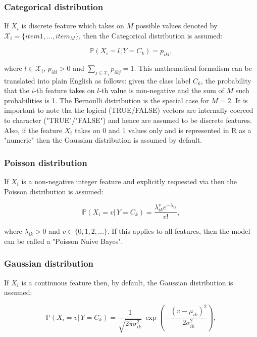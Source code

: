 \documentclass{article}\usepackage[]{graphicx}\usepackage[]{color}
\begin{document}
\subsubsection{Categorical distribution}

If $X_i$ is discrete feature which takes on $M$ possible values denoted by $\mathcal{X}_i = \{item1, ..., item_M\}$, then the Categorical distribution is assumed:

    \begin{equation}
     \mathbb{P}(X_i = l \, | Y = C_k) = p_{ikl},
    \end{equation}

where $l \in \mathcal{X}_i$,  $p_{ikl} > 0$ and $\sum_{j \in\mathcal{X}_i} p_{ikj} = 1$. This mathematical formalism can be translated into plain English as follows: given the class label $C_k$, the probability that the $i$-th feature takes on $l$-th value is non-negative and the sum of $M$ such probabilities is 1. The Bernoulli distribution is the special case for $M=2$. It is important to note tha the logical (TRUE/FALSE) vectors are internally coerced to character ("TRUE"/"FALSE") and hence are assumed to be discrete features. Also, if the feature $X_i$ takes on 0 and 1 values only and is represented in R as a "numeric" then the Gaussian distribution is assumed by default.

\subsubsection{Poisson distribution}

If $X_i$ is a non-negative integer feature and explicitly requested via \textcolor{darkgreen}{{}} then the Poisson distribution is assumed:

$$\mathbb{P}(X_i=v | \, Y = C_k) = \frac{\lambda_{ik}^v e^{-\lambda_{ik}}}{v!},$$

where $\lambda_{ik} > 0$ and $v \in \{0,1,2,...\}$. If this applies to all features, then the model can be called a "Poisson Naive Bayes".


\subsubsection{Gaussian distribution}

If $X_i$ is a continuous feature then, by default, the Gaussian distribution is assumed:

$$\mathbb{P}(X_i = v | \, Y = C_k) = \frac{1}{\sqrt{2 \pi \sigma^2_{ik}}} \, \exp \left(- \frac{(v - \mu_{ik})^2}{2 \sigma^2_{ik}}\right),$$
\end{document}
